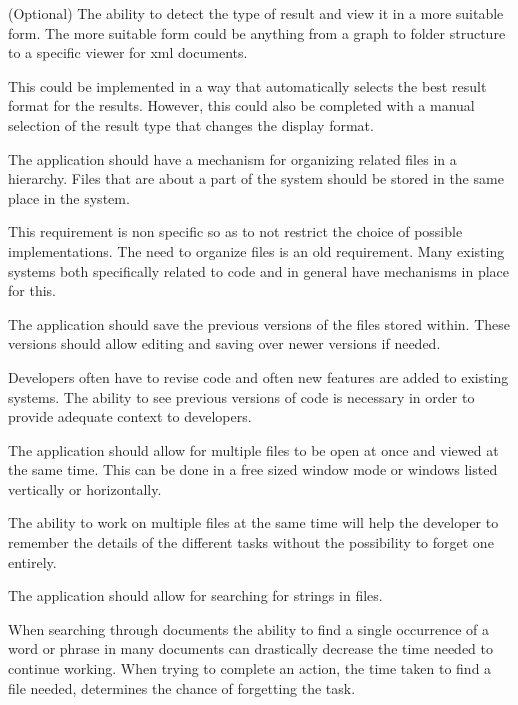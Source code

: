 \begin{requirement}{(Optional)}
The ability to detect the type of result and view it in a
more suitable form. The more suitable form could be anything from a
graph to folder structure to a specific viewer for xml documents.

This could be implemented in a way that automatically selects the best result format for the results. However, this could also be completed with a manual selection of the result type that changes the display format.
\end{requirement}

\begin{requirement}
The application should have a mechanism for organizing related files in
a hierarchy. Files that are about a part of the system should be stored
in the same place in the system.

This requirement is non specific so as to not restrict the choice of possible implementations. The need to organize files is an old requirement. Many existing systems both specifically related to code and in general have mechanisms in place for this.
\end{requirement}

\begin{requirement}
The application should save the previous versions of the files stored within. These versions should allow editing and saving over newer versions if needed.

Developers often have to revise code and often new features are added to existing systems. The ability to see previous versions of code is necessary in order to provide adequate context to developers.
\end{requirement}

\begin{requirement}
The application should allow for multiple files to
be open at once and viewed at the same time. This can be done in a free
sized window mode or windows listed vertically or horizontally.

The ability to work on multiple files at the same time will help the developer to remember the details of the different tasks without the possibility to forget one entirely.
\end{requirement}

\begin{requirement}
The application should allow for searching for strings in files.

When searching through documents the ability to find a single occurrence of a word or phrase in many documents can drastically decrease the time needed to continue working. When trying to complete an action, the time taken to find a file needed, determines the chance of forgetting the task.
\end{requirement}


